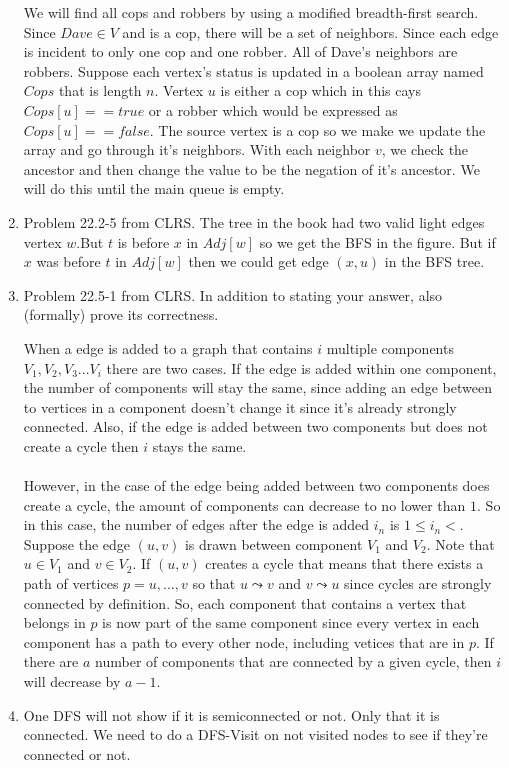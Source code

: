 \documentclass[letterpaper,11pt]{article}
\begin{document}
\begin{enumerate}
We will find all cops and robbers by using a modified breadth-first search. Since $Dave \in V$ and is a cop, there will be a set of neighbors. Since each edge is incident to only one cop and one robber. All of Dave's neighbors are robbers. Suppose each vertex's status is updated in a boolean array named $Cops$ that is length $n$. Vertex $u$ is either a cop which in this cays $Cops[u] == true$ or a robber which would be expressed as $Cops[u] == false$. The source vertex is a cop so we make we update the array and go through it's neighbors. With each neighbor $v$, we check the ancestor and then change the value to be the negation of it's ancestor. We will do this until the main queue is empty.
\item Problem 22.2-5 from CLRS.
The tree in the book had two valid light edges vertex $w$.But $t$ is before $x$ in $Adj[w]$ so we get the BFS in the figure. But if $x$ was before $t$ in $Adj[w]$ then we could get edge $(x,u)$ in the BFS tree.
\item Problem 22.5-1 from CLRS. In addition to stating your answer, also (formally) prove its correctness.

When a edge is added to a graph that contains $i$ multiple components $V_1,V_2,V_3...V_i$ there are two cases. If the edge is added within one component, the number of components will stay the same, since adding an edge between to vertices in a component doesn't change it since it's already strongly connected. Also, if the edge is added between two components but does not create a cycle then $i$ stays the same. \\ \\ However, in the case of the edge being added between two components does create a cycle, the amount of components can decrease to no lower than $1$. So in this case, the number of edges after the edge is added $i_n$ is $1 \leq i_n <$. Suppose the edge $(u,v)$ is drawn between component $V_1$ and $V_2$. Note that $u \in V_1$ and $v \in V_2$. If $(u,v)$ creates a cycle that means that there exists a path of vertices $p = {u,...,v}$ so that $u \leadsto v$ and $v \leadsto u$ since cycles are strongly connected by definition. So, each component that contains a vertex that belongs in $p$ is now part of the same component since every vertex in each component has a path to every other node, including vetices that are in $p$.  If there are $a$ number of components that are connected by a given cycle, then $i$ will decrease by $a-1$. 
 
\item 
One DFS will not show if it is semiconnected or not. Only that it is connected. We need to do a DFS-Visit on not visited nodes to see if they're connected or not.


\end{enumerate}
\end{document}
